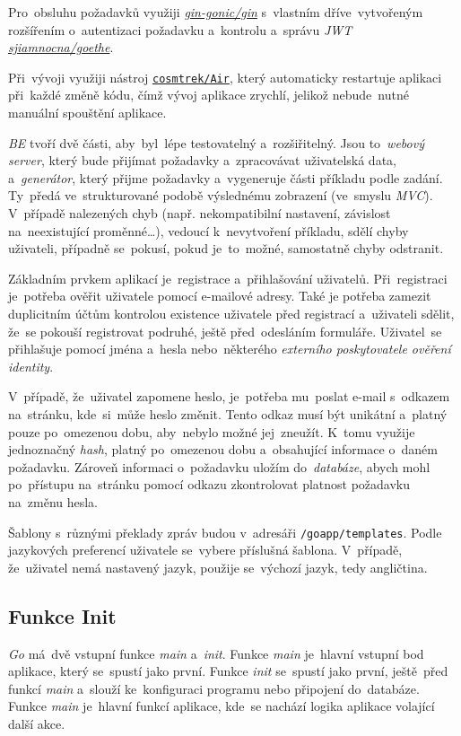 \documentclass[11pt,a4paper]{report}
\let\oldacrshort\acrshort
\renewcommand{\acrshort}[1]{\emph{\normalsize\color[rgb]{0,0,0}\noindent\oldacrshort{#1}}}
\begin{document}
            Pro~obsluhu požadavků využiji \href{https://github.com/gin-gonic/gin}{\emph{gin-gonic/gin}} s~vlastním dříve~vytvořeným rozšířením o~autentizaci požadavku a~kontrolu a~správu \acrshort{JWT} \href{https://gitlab.com/sjiamnocna/goethe}{\emph{sjiamnocna/goethe}}.

            Při~vývoji využiji nástroj \href{https://github.com/cosmtrek/air}{\texttt{cosmtrek/Air}}, který automaticky restartuje aplikaci při~každé změně kódu, čímž vývoj aplikace zrychlí, jelikož nebude~nutné manuální spouštění aplikace.

            \acrshort{BE} tvoří dvě části, aby~byl~lépe testovatelný a~rozšiřitelný. Jsou to~\emph{webový server}, který bude přijímat požadavky a~zpracovávat uživatelská data, a~\emph{generátor}, který přijme požadavky a~vygeneruje části příkladu podle zadání. Ty~předá ve~strukturované podobě výslednému zobrazení (ve~smyslu \emph{MVC}). V~případě nalezených chyb (např. nekompatibilní nastavení, závislost na~neexistující proměnné\dots), vedoucí k~nevytvoření příkladu, sdělí chyby uživateli, případně se~pokusí, pokud je~to~možné, samostatně chyby odstranit.

            Základním prvkem aplikací je~registrace a~přihlašování uživatelů. Při~registraci je~potřeba ověřit uživatele pomocí e-mailové adresy. Také je potřeba zamezit duplicitním účtům kontrolou existence uživatele před registrací a~uživateli sdělit, že~se pokouší registrovat podruhé, ještě před~odesláním formuláře. Uživatel~se přihlašuje pomocí jména a~hesla nebo~některého \emph{externího poskytovatele ověření identity}.
            
            V~případě, že~uživatel zapomene heslo, je~potřeba mu~poslat e-mail s~odkazem na~stránku, kde~si~může heslo změnit. Tento odkaz musí být unikátní a~platný pouze po~omezenou dobu, aby~nebylo možné jej~zneužít. K~tomu využije jednoznačný \emph{hash}, platný po~omezenou dobu a~obsahující informace o~daném požadavku. Zároveň informaci o~požadavku uložím do~\emph{databáze}, abych mohl po~přístupu na~stránku pomocí odkazu zkontrolovat platnost požadavku na~změnu hesla.

            Šablony s~různými překlady zpráv budou v~adresáři \texttt{/goapp/templates}. Podle jazykových preferencí uživatele se~vybere příslušná šablona. V~případě, že~uživatel nemá nastavený jazyk, použije se~výchozí jazyk, tedy angličtina.
            
        \subsection{Funkce Init}
            \emph{Go} má~dvě vstupní funkce \emph{main} a~\emph{init}. Funkce \emph{main} je~hlavní vstupní bod aplikace, který se~spustí jako první. Funkce \emph{init} se~spustí jako první, ještě~před funkcí \emph{main} a~slouží ke~konfiguraci programu nebo připojení do~databáze. Funkce \emph{main} je~hlavní funkcí aplikace, kde~se nachází logika aplikace volající další akce.
\end{document}
